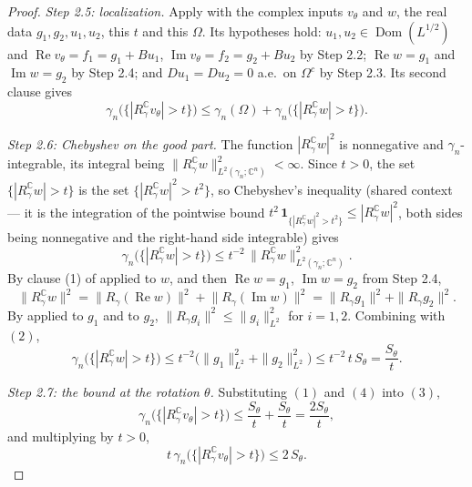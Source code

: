 \begin{proof}
\emph{Step 2.5: localization.}
Apply  with the complex inputs
$v_\theta$ and $w$, the real data $g_1, g_2, u_1, u_2$, this $t$ and this
$\Omega$.  Its hypotheses hold: $u_1, u_2 \in \operatorname{Dom}(L^{1/2})$ and
$\operatorname{Re} v_\theta = f_1 = g_1 + Bu_1$,
$\operatorname{Im} v_\theta = f_2 = g_2 + Bu_2$ by Step 2.2;
$\operatorname{Re} w = g_1$ and $\operatorname{Im} w = g_2$ by Step 2.4; and
$Du_1 = Du_2 = 0$ a.e.\ on $\Omega^c$ by Step 2.3.  Its second clause gives
\begin{equation*}
  \gamma_n\bigl(\{|R_\gamma^{\mathbb{C}} v_\theta| > t\}\bigr)
    \leq \gamma_n(\Omega)
      + \gamma_n\bigl(\{|R_\gamma^{\mathbb{C}} w| > t\}\bigr) . \tag{3}
\end{equation*}

\emph{Step 2.6: Chebyshev on the good part.}
The function $|R_\gamma^{\mathbb{C}} w|^2$ is nonnegative and
$\gamma_n$-integrable, its integral being
$\|R_\gamma^{\mathbb{C}} w\|_{L^2(\gamma_n;\mathbb{C}^n)}^2 < \infty$.  Since
$t > 0$, the set $\{|R_\gamma^{\mathbb{C}} w| > t\}$ is the set
$\{|R_\gamma^{\mathbb{C}} w|^2 > t^2\}$, so Chebyshev's inequality (shared
context --- it is the integration of the pointwise bound
$t^2\,\mathbf{1}_{\{|R_\gamma^{\mathbb{C}} w|^2 > t^2\}}
  \leq |R_\gamma^{\mathbb{C}} w|^2$, both sides being nonnegative and the
right-hand side integrable) gives
\[
  \gamma_n\bigl(\{|R_\gamma^{\mathbb{C}} w| > t\}\bigr)
    \leq t^{-2}\,\bigl\|R_\gamma^{\mathbb{C}} w\bigr\|_{L^2(\gamma_n;\mathbb{C}^n)}^2 .
\]
By clause (1) of  applied to $w$, and then
$\operatorname{Re} w = g_1$, $\operatorname{Im} w = g_2$ from Step 2.4,
\[
  \bigl\|R_\gamma^{\mathbb{C}} w\bigr\|^2
    = \bigl\|R_\gamma(\operatorname{Re} w)\bigr\|^2
      + \bigl\|R_\gamma(\operatorname{Im} w)\bigr\|^2
    = \|R_\gamma g_1\|^2 + \|R_\gamma g_2\|^2 .
\]
By  applied to $g_1$ and to $g_2$,
$\|R_\gamma g_i\|^2 \leq \|g_i\|_{L^2}^2$ for $i = 1,2$.  Combining with $(2)$,
\begin{equation*}
  \gamma_n\bigl(\{|R_\gamma^{\mathbb{C}} w| > t\}\bigr)
    \leq t^{-2}\bigl(\|g_1\|_{L^2}^2 + \|g_2\|_{L^2}^2\bigr)
    \leq t^{-2}\,t\,S_\theta = \frac{S_\theta}{t} . \tag{4}
\end{equation*}

\emph{Step 2.7: the bound at the rotation $\theta$.}
Substituting $(1)$ and $(4)$ into $(3)$,
\[
  \gamma_n\bigl(\{|R_\gamma^{\mathbb{C}} v_\theta| > t\}\bigr)
    \leq \frac{S_\theta}{t} + \frac{S_\theta}{t} = \frac{2S_\theta}{t} ,
\]
and multiplying by $t > 0$,
\begin{equation*}
  t\,\gamma_n\bigl(\{|R_\gamma^{\mathbb{C}} v_\theta| > t\}\bigr)
    \leq 2\,S_\theta . \tag{5}
\end{equation*}


\end{proof}
